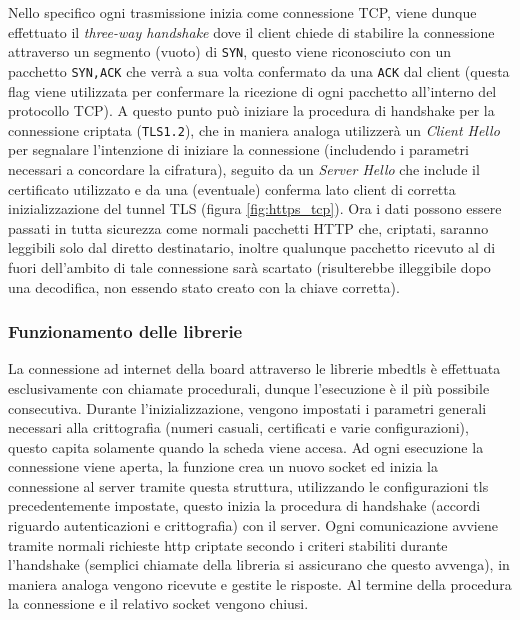 Nello specifico ogni trasmissione inizia come connessione TCP, viene dunque effettuato il \textit{three-way handshake} dove il client chiede di stabilire la connessione attraverso un segmento (vuoto) di \texttt{SYN}, questo viene riconosciuto con un pacchetto \texttt{SYN,ACK} che verr\`a a sua volta confermato da una \texttt{ACK} dal client (questa flag viene utilizzata per confermare la ricezione di ogni pacchetto all'interno del protocollo TCP). A questo punto pu\`o iniziare la procedura di handshake per la connessione criptata (\texttt{TLS1.2}), che in maniera analoga utilizzer\`a un \textit{Client Hello} per segnalare l'intenzione di iniziare la connessione (includendo i parametri necessari a concordare la cifratura), seguito da un \textit{Server Hello} che include il certificato utilizzato e da una (eventuale) conferma lato client di corretta inizializzazione del tunnel TLS (figura \ref{fig:https_tcp}). Ora i dati possono essere passati in tutta sicurezza come normali pacchetti HTTP che, criptati, saranno leggibili solo dal diretto destinatario, inoltre qualunque pacchetto ricevuto al di fuori dell'ambito di tale connessione sar\`a scartato (risulterebbe illeggibile dopo una decodifica, non essendo stato creato con la chiave corretta).

\subsubsection{Funzionamento delle librerie}

La connessione ad internet della board attraverso le librerie mbedtls \`e effettuata esclusivamente con chiamate procedurali, dunque l'esecuzione \`e il pi\`u possibile consecutiva. Durante l'inizializzazione, vengono impostati i parametri generali necessari alla crittografia (numeri casuali, certificati e varie configurazioni), questo capita solamente quando la scheda viene accesa. Ad ogni esecuzione la connessione viene aperta, la funzione crea un nuovo socket ed inizia la connessione al server tramite questa struttura, utilizzando le configurazioni tls precedentemente impostate, questo inizia la procedura di handshake (accordi riguardo autenticazioni e crittografia) con il server. Ogni comunicazione avviene tramite normali richieste http criptate secondo i criteri stabiliti durante l'handshake (semplici chiamate della libreria si assicurano che questo avvenga), in maniera analoga vengono ricevute e gestite le risposte. Al termine della procedura la connessione e il relativo socket vengono chiusi.

